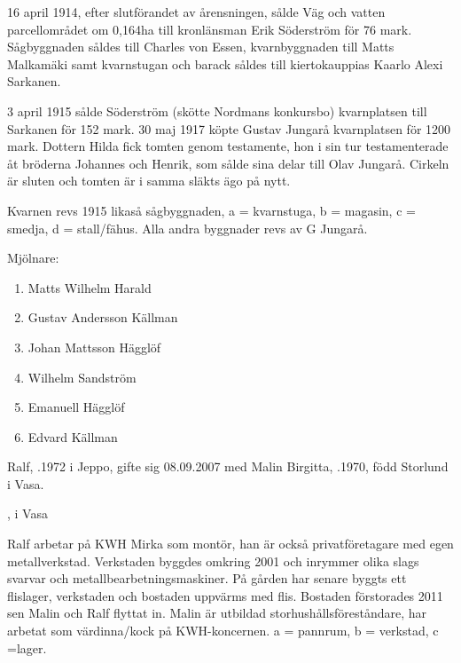 16 april 1914, efter slutförandet av årensningen, sålde Väg och vatten parcellområdet om 0,164ha till kronlänsman Erik Söderström för 76 mark. Sågbyggnaden såldes till Charles von Essen, kvarnbyggnaden till Matts Malkamäki samt kvarnstugan och barack såldes till kiertokauppias Kaarlo Alexi Sarkanen.

3 april 1915 sålde Söderström (skötte Nordmans konkursbo) kvarnplatsen till Sarkanen för 152 mark. 30 maj 1917 köpte Gustav Jungarå kvarnplatsen för 1200 mark. Dottern Hilda fick tomten genom testamente, hon i sin tur testamenterade åt bröderna Johannes och Henrik, som sålde sina delar till Olav Jungarå. Cirkeln är sluten och tomten är i samma släkts ägo på nytt.

Kvarnen revs 1915 likaså sågbyggnaden, a = kvarnstuga, b = magasin, c = smedja, d = stall/fähus. Alla andra byggnader revs av G Jungarå.

Mjölnare:
\begin{enumerate}
  \item Matts Wilhelm Harald
  \item Gustav Andersson Källman
  \item Johan Mattsson Hägglöf
  \item Wilhelm Sandström
  \item Emanuell Hägglöf
  \item Edvard Källman
\end{enumerate}






Ralf, .1972 i Jeppo, gifte sig 08.09.2007 med Malin Birgitta, .1970, född Storlund i Vasa.
\begin{jhchildren}
  \item {}, i Vasa
  \item {}
  \item {}
\end{jhchildren}

Ralf arbetar på KWH Mirka som montör, han är också privatföretagare med egen metallverkstad. Verkstaden byggdes omkring 2001 och inrymmer olika slags svarvar och metallbearbetningsmaskiner. På gården har senare byggts ett flislager, verkstaden och bostaden uppvärms med flis. Bostaden förstorades 2011 sen Malin och Ralf flyttat in. Malin är utbildad storhushållsföreståndare, har	arbetat som värdinna/kock på KWH-koncernen. a = pannrum, b = verkstad, c =lager.


